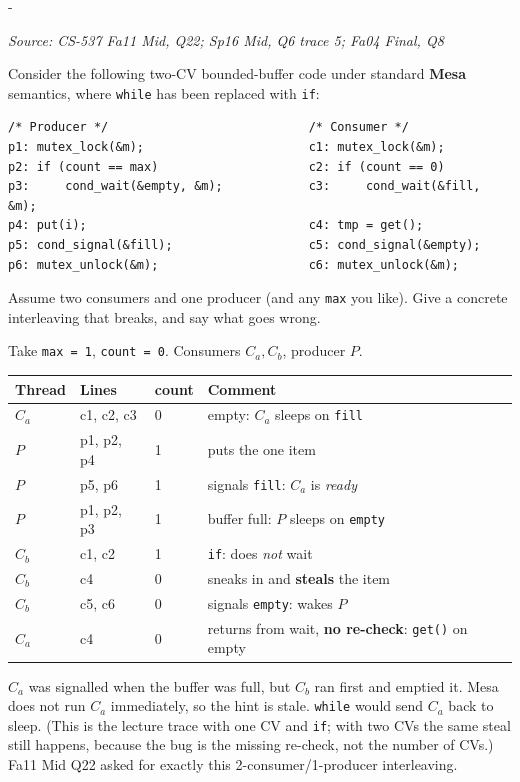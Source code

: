 \documentclass[11pt,a4paper]{article}
\makeatletter
\newcommand{\keepspace}[1]{\par\penalty-100\begingroup
  \setlength{\dimen@}{#1}\dimen@ii\pagegoal\advance\dimen@ii-\pagetotal
  \ifdim\dimen@>\dimen@ii\ifdim\dimen@ii>\z@\vfil\fi\break\fi\endgroup}
\newcounter{qn}[section]
\newenvironment{Qn}[4]{%
  \refstepcounter{qn}\keepspace{7\baselineskip}%
  \begin{tcolorbox}[qboxstyle, title={Q\thesection.\theqn\ \ [#1 \textbar\ #2]\ \ #4}]%
  {\footnotesize\color{g3}\textit{Source: #3}}\par\smallskip%
}{%
  \end{tcolorbox}%
}
\newenvironment{Sol}{%
  \begin{tcolorbox}[sboxstyle, title={Solution}]%
}{%
  \end{tcolorbox}\vspace{0.35em}%
}
\makeatother
\begin{document}
\begin{Qn}{Hard}{Lect 18}{CS-537 Fa11 Mid, Q22; Sp16 Mid, Q6 trace 5; Fa04 Final, Q8}{\texttt{if} instead of \texttt{while}: stolen wakeup}
Consider the following two-CV bounded-buffer code under standard \textbf{Mesa} semantics, where \texttt{while} has been replaced with \texttt{if}:
\begin{lstlisting}[numbers=none]
/* Producer */                            /* Consumer */
p1: mutex_lock(&m);                       c1: mutex_lock(&m);
p2: if (count == max)                     c2: if (count == 0)
p3:     cond_wait(&empty, &m);            c3:     cond_wait(&fill, &m);
p4: put(i);                               c4: tmp = get();
p5: cond_signal(&fill);                   c5: cond_signal(&empty);
p6: mutex_unlock(&m);                     c6: mutex_unlock(&m);
\end{lstlisting}
Assume two consumers and one producer (and any \texttt{max} you like). Give a concrete interleaving that breaks, and say what goes wrong.
\end{Qn}
\begin{Sol}
Take \texttt{max = 1}, \texttt{count = 0}. Consumers $C_a,C_b$,
producer $P$.

\begin{center}
\small
\begin{tabular}{@{}llll@{}}
  \textbf{Thread} & \textbf{Lines} & \textbf{count} & \textbf{Comment} \\
  \midrule
  $C_a$ & c1, c2, c3 & 0 & empty: $C_a$ sleeps on \texttt{fill} \\
  $P$   & p1, p2, p4 & 1 & puts the one item \\
  $P$   & p5, p6     & 1 & signals \texttt{fill}: $C_a$ is \emph{ready} \\
  $P$   & p1, p2, p3 & 1 & buffer full: $P$ sleeps on \texttt{empty} \\
  $C_b$ & c1, c2     & 1 & \texttt{if}: does \emph{not} wait \\
  $C_b$ & c4         & 0 & sneaks in and \textbf{steals} the item \\
  $C_b$ & c5, c6     & 0 & signals \texttt{empty}: wakes $P$ \\
  $C_a$ & c4         & 0 & returns from wait, \textbf{no re-check}: \texttt{get()} on empty \\
\end{tabular}
\end{center}
$C_a$ was signalled when the buffer was full, but $C_b$ ran first and
emptied it. Mesa does not run $C_a$ immediately, so the hint is stale.
\texttt{while} would send $C_a$ back to sleep. (This is the lecture
trace with one CV and \texttt{if}; with two CVs the same steal still
happens, because the bug is the missing re-check, not the number of
CVs.) Fa11 Mid Q22 asked for exactly this 2-consumer/1-producer
interleaving.
\end{Sol}
\end{document}
